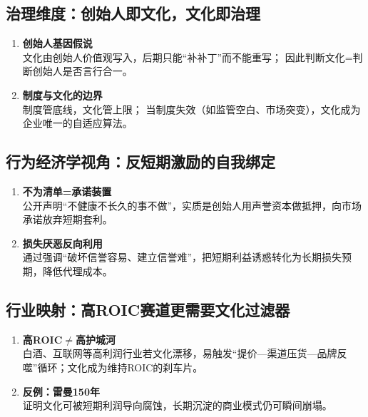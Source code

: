 \subsection{治理维度：创始人即文化，文化即治理}
\begin{enumerate}[leftmargin=*, nosep]
    \item \textbf{创始人基因假说}  \\
    文化由创始人价值观写入，后期只能“补补丁”而不能重写；  
    因此判断文化=判断创始人是否言行合一。
    \item \textbf{制度与文化的边界}\\  
    制度管底线，文化管上限；  
    当制度失效（如监管空白、市场突变），文化成为企业唯一的自适应算法。
\end{enumerate}

\subsection{行为经济学视角：反短期激励的自我绑定}
\begin{enumerate}[leftmargin=*, nosep]
    \item \textbf{不为清单=承诺装置}  \\
    公开声明“不健康不长久的事不做”，实质是创始人用声誉资本做抵押，{\color{red}向市场承诺放弃短期套利}。
    \item \textbf{损失厌恶反向利用}  \\
    通过强调“破坏信誉容易、建立信誉难”，把短期利益诱惑转化为长期损失预期，降低代理成本。
\end{enumerate}

\subsection{行业映射：高ROIC赛道更需要文化过滤器}
\begin{enumerate}[leftmargin=*, nosep]
    \item \textbf{高ROIC$\neq$高护城河}  \\
    白酒、互联网等高利润行业若文化漂移，易触发“提价—渠道压货—品牌反噬”循环；文化成为维持ROIC的刹车片。
    \item \textbf{反例：雷曼150年}  \\
    证明文化可被短期利润导向腐蚀，长期沉淀的商业模式仍可瞬间崩塌。
\end{enumerate}

